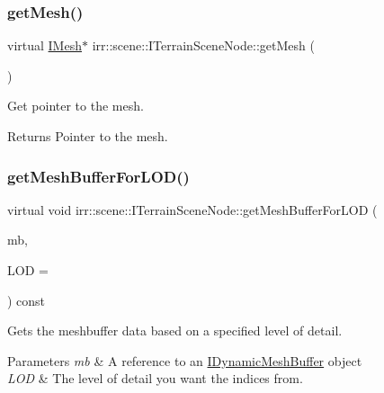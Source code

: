 \subsubsection{\texorpdfstring{get\+Mesh()}{getMesh()}}
{\footnotesize\ttfamily virtual \hyperlink{classirr_1_1scene_1_1IMesh}{I\+Mesh}$\ast$ irr\+::scene\+::\+I\+Terrain\+Scene\+Node\+::get\+Mesh (\begin{DoxyParamCaption}{ }\end{DoxyParamCaption})\hspace{0.3cm}{\ttfamily [pure virtual]}}



Get pointer to the mesh. 

\begin{DoxyReturn}{Returns}
Pointer to the mesh. 
\end{DoxyReturn}
\mbox{\label{classirr_1_1scene_1_1ITerrainSceneNode_ae23af8c2066da39ad10714dcf95dd8f1}} 
\subsubsection{\texorpdfstring{get\+Mesh\+Buffer\+For\+L\+O\+D()}{getMeshBufferForLOD()}}
{\footnotesize\ttfamily virtual void irr\+::scene\+::\+I\+Terrain\+Scene\+Node\+::get\+Mesh\+Buffer\+For\+L\+OD (\begin{DoxyParamCaption}\item[{\hyperlink{classirr_1_1scene_1_1IDynamicMeshBuffer}{I\+Dynamic\+Mesh\+Buffer} \&}]{mb,  }\item[{\hyperlink{namespaceirr_ac66849b7a6ed16e30ebede579f9b47c6}{s32}}]{L\+OD = {} }\end{DoxyParamCaption}) const\hspace{0.3cm}{\ttfamily [pure virtual]}}



Gets the meshbuffer data based on a specified level of detail. 


\begin{DoxyParams}{Parameters}
{\em mb} & A reference to an \hyperlink{classirr_1_1scene_1_1IDynamicMeshBuffer}{I\+Dynamic\+Mesh\+Buffer} object \\
\hline
{\em L\+OD} & The level of detail you want the indices from. \\
\hline
\end{DoxyParams}
\mbox{\label{classirr_1_1scene_1_1ITerrainSceneNode_ae5c598195e3faafb7cc58b71beb7ee1b}} 
